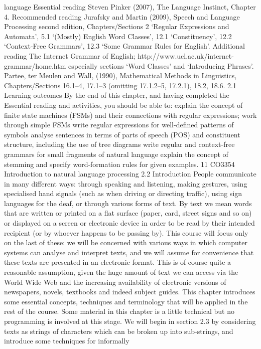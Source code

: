 language
Essential reading
Steven Pinker (2007), The Language Instinct, Chapter 4.
Recommended reading
Jurafsky and Martin (2009), Speech and Language Processing second edition,
Chapters/Sections 2 ‘Regular Expressions and Automata’, 5.1 ‘(Mostly) English Word
Classes’, 12.1 ‘Constituency’, 12.2 ‘Context-Free Grammars’, 12.3 ‘Some Grammar
Rules for English’.
Additional reading
The Internet Grammar of English;
http://www.ucl.ac.uk/internet-grammar/home.htm especially sections ‘Word
Classes’ and ‘Introducing Phrases’.
Partee, ter Meulen and Wall, (1990), Mathematical Methods in Linguistics,
Chapters/Sections 16.1–4, 17.1–3 (omitting 17.1.2–5, 17.2.1), 18.2, 18.6.
2.1 Learning outcomes
By the end of this chapter, and having completed the Essential reading and activities,
you should be able to:
explain the concept of finite state machines (FSMs) and their connections with
regular expressions; work through simple FSMs
write regular expressions for well-defined patterns of symbols
analyse sentences in terms of parts of speech (POS) and constituent structure,
including the use of tree diagrams
write regular and context-free grammars for small fragments of natural language
explain the concept of stemming and specify word-formation rules for given
examples.
11
CO3354 Introduction to natural language processing
2.2 Introduction
People communicate in many different ways: through speaking and listening,
making gestures, using specialised hand signals (such as when driving or directing
traffic), using sign languages for the deaf, or through various forms of text.
By text we mean words that are written or printed on a flat surface (paper, card,
street signs and so on) or displayed on a screen or electronic device in order to be
read by their intended recipient (or by whoever happens to be passing by).
This course will focus only on the last of these: we will be concerned with various
ways in which computer systems can analyse and interpret texts, and we will assume
for convenience that these texts are presented in an electronic format. This is of
course quite a reasonable assumption, given the huge amount of text we can access
via the World Wide Web and the increasing availability of electronic versions of
newspapers, novels, textbooks and indeed subject guides. This chapter introduces
some essential concepts, techniques and terminology that will be applied in the rest
of the course. Some material in this chapter is a little technical but no programming
is involved at this stage.
We will begin in section 2.3 by considering texts as strings of characters which can
be broken up into sub-strings, and introduce some techniques for informally
